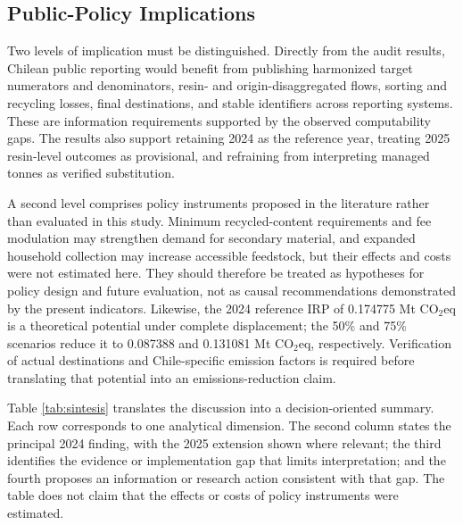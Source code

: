 \documentclass[review,10pt]{elsarticle}
\newcommand{\revpar}[1]{#1\par\medskip}
\newcommand{\changepar}[1]{#1\par\medskip}
\begin{document}
\subsection{Public-Policy Implications}

\changepar{Two levels of implication must be distinguished. Directly from the audit results, Chilean public reporting would benefit from publishing harmonized target numerators and denominators, resin- and origin-disaggregated flows, sorting and recycling losses, final destinations, and stable identifiers across reporting systems. These are information requirements supported by the observed computability gaps. The results also support retaining 2024 as the reference year, treating 2025 resin-level outcomes as provisional, and refraining from interpreting managed tonnes as verified substitution.}

\changepar{A second level comprises policy instruments proposed in the literature rather than evaluated in this study. Minimum recycled-content requirements and fee modulation may strengthen demand for secondary material, and expanded household collection may increase accessible feedstock, but their effects and costs were not estimated here. They should therefore be treated as hypotheses for policy design and future evaluation, not as causal recommendations demonstrated by the present indicators. Likewise, the 2024 reference IRP of 0.174775 Mt CO$_2$eq is a theoretical potential under complete displacement; the 50\% and 75\% scenarios reduce it to 0.087388 and 0.131081 Mt CO$_2$eq, respectively. Verification of actual destinations and Chile-specific emission factors is required before translating that potential into an emissions-reduction claim.}

\revpar{Table \ref{tab:sintesis} translates the discussion into a decision-oriented summary. Each row corresponds to one analytical dimension. The second column states the principal 2024 finding, with the 2025 extension shown where relevant; the third identifies the evidence or implementation gap that limits interpretation; and the fourth proposes an information or research action consistent with that gap. The table does not claim that the effects or costs of policy instruments were estimated.}
\end{document}
